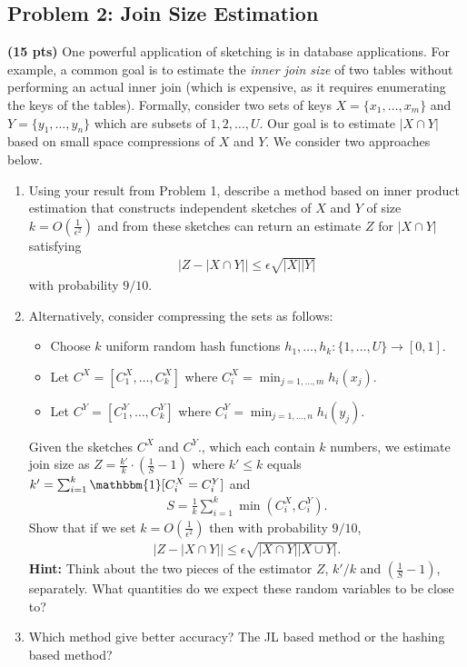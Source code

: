\documentclass[10pt]{article}
\begin{document}
\subsection{Problem 2: Join Size Estimation}
\noindent\textbf{(15 pts)}
One powerful application of sketching is in database applications. For example, a common goal is to estimate the \emph{inner join size} of two tables without performing an actual inner join (which is expensive, as it requires enumerating the keys of the tables). Formally, consider two sets of keys $X = \{x_1, \ldots, x_m\}$ and $Y = \{y_1, \ldots, y_n\}$ which are subsets of $1,2, \ldots, U$.  Our goal is to estimate $|X\cap Y|$ based on small space compressions of $X$ and $Y$.  We consider two approaches below.
\begin{enumerate}
\item Using your result from Problem 1, describe a method based on inner product estimation that constructs independent sketches of $X$ and $Y$ of size  $k = O\left(\frac{1}{\epsilon^2}\right)$ and from these sketches can return an estimate $Z$ for $|X\cap Y|$ satisfying
\begin{align*}
	\left|Z - |X\cap Y|\right| \leq \epsilon \sqrt{|X||Y|}
\end{align*}
with probability $9/10$.

\item Alternatively, consider compressing the sets as follows:
\begin{itemize}
	\item Choose $k$ uniform random hash functions $h_1, \ldots, h_k: \{1, \ldots, U\}\rightarrow [0,1]$. 
	\item Let $C^X = [C^X_1,  \ldots, C^X_k]$ where $C_i^X = \min_{j = 1, \ldots, m} h_i(x_j)$.
	\item Let $C^Y = [C^Y_1,  \ldots, C^Y_k]$ where $C_i^Y= \min_{j = 1, \ldots, n} h_i(y_j)$.
\end{itemize}
Given the sketches $C^X$ and $C^Y$., which each contain $k$ numbers, we estimate join size as $Z = \frac{k'}{k} \cdot (\frac{1}{S} - 1)$ where $k' \leq k$ equals $k' = \sum_{i=1}^k \mathbbm{1}[C^X_i = C^Y_i]$ and 
\begin{align*}
	S = \frac{1}{k}\sum_{i=1}^k \min(C^X_i,C^Y_i).
\end{align*}
Show that if we set $k = O(\frac{1}{\epsilon^2})$ then with probability $9/10$,
\begin{align*}
	\left|Z - |X\cap Y|\right| \leq \epsilon \sqrt{|X\cap Y||X\cup Y|}.
\end{align*}
\textbf{Hint:} Think about the two pieces of the estimator $Z$, $k'/k$ and $(\frac{1}{S} - 1)$, separately. What quantities do we expect these random variables to be close to? 
\item Which method give better accuracy? The JL based method or the hashing based method?
\end{enumerate}
\end{document}
